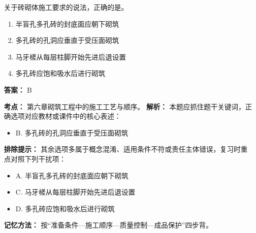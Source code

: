 \documentclass[UTF8,fontset=fandol,11pt]{ctexart}
\begin{document}
\begin{quizbox}[title={第 24 题}]
关于砖砌体施工要求的说法，正确的是。\\
\begin{enumerate}[label=\Alph*.]
\item 半盲孔多孔砖的封底面应朝下砌筑
\item 多孔砖的孔洞应垂直于受压面砌筑
\item 马牙槎从每层柱脚开始先进后退设置
\item 多孔砖应饱和吸水后进行砌筑
\end{enumerate}
\textbf{答案：} B
\vspace{0.25em}
\begin{answerbox}[title={考点解析}]
\textbf{考点：} 第六章砌筑工程中的施工工艺与顺序。
\textbf{解析：} 本题应抓住题干关键词，正确选项对应教材或课件中的核心表述：
\begin{itemize}
\item B. 多孔砖的孔洞应垂直于受压面砌筑
\end{itemize}
\textbf{排除提示：} 其余选项多属于概念混淆、适用条件不符或责任主体错误，复习时重点对照下列干扰项：
\begin{itemize}
\item A. 半盲孔多孔砖的封底面应朝下砌筑
\item C. 马牙槎从每层柱脚开始先进后退设置
\item D. 多孔砖应饱和吸水后进行砌筑
\end{itemize}
\textbf{记忆方法：} 按“准备条件—施工顺序—质量控制—成品保护”四步背。
\end{answerbox}
\end{quizbox}
\end{document}
